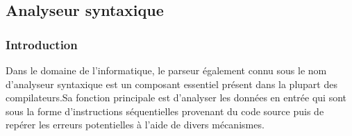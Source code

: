 \documentclass{rapport}
\begin{document}


\newpage
\subsection{Analyseur syntaxique}
\subsubsection{Introduction}
Dans le domaine de l'informatique, le parseur également connu sous le nom d'analyseur syntaxique est un composant essentiel présent dans la plupart des compilateurs.\footnotemark[1] Sa fonction principale est d'analyser les données en entrée qui sont sous la forme d'instructions séquentielles provenant du code source puis de repérer les erreurs potentielles à l'aide de divers mécanismes. 
\end{document}
